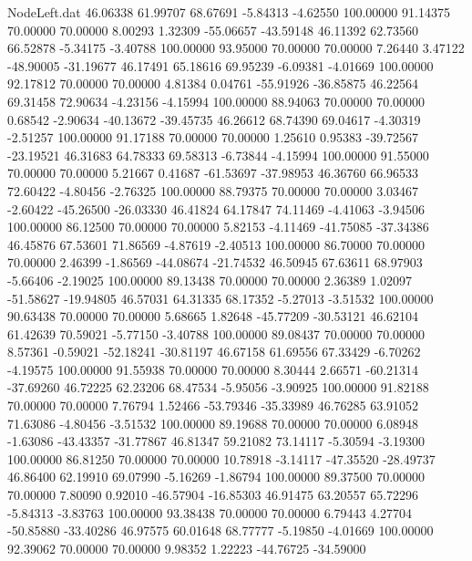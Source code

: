 \begin{filecontents}{NodeLeft.dat}
  46.06338   61.99707   68.67691    -5.84313   -4.62550  100.00000   91.14375   70.00000   70.00000    8.00293    1.32309  -55.06657  -43.59148
  46.11392   62.73560   66.52878    -5.34175   -3.40788  100.00000   93.95000   70.00000   70.00000    7.26440    3.47122  -48.90005  -31.19677
  46.17491   65.18616   69.95239    -6.09381   -4.01669  100.00000   92.17812   70.00000   70.00000    4.81384    0.04761  -55.91926  -36.85875
  46.22564   69.31458   72.90634    -4.23156   -4.15994  100.00000   88.94063   70.00000   70.00000    0.68542   -2.90634  -40.13672  -39.45735
  46.26612   68.74390   69.04617    -4.30319   -2.51257  100.00000   91.17188   70.00000   70.00000    1.25610    0.95383  -39.72567  -23.19521
  46.31683   64.78333   69.58313    -6.73844   -4.15994  100.00000   91.55000   70.00000   70.00000    5.21667    0.41687  -61.53697  -37.98953
  46.36760   66.96533   72.60422    -4.80456   -2.76325  100.00000   88.79375   70.00000   70.00000    3.03467   -2.60422  -45.26500  -26.03330
  46.41824   64.17847   74.11469    -4.41063   -3.94506  100.00000   86.12500   70.00000   70.00000    5.82153   -4.11469  -41.75085  -37.34386
  46.45876   67.53601   71.86569    -4.87619   -2.40513  100.00000   86.70000   70.00000   70.00000    2.46399   -1.86569  -44.08674  -21.74532
  46.50945   67.63611   68.97903    -5.66406   -2.19025  100.00000   89.13438   70.00000   70.00000    2.36389    1.02097  -51.58627  -19.94805
  46.57031   64.31335   68.17352    -5.27013   -3.51532  100.00000   90.63438   70.00000   70.00000    5.68665    1.82648  -45.77209  -30.53121
  46.62104   61.42639   70.59021    -5.77150   -3.40788  100.00000   89.08437   70.00000   70.00000    8.57361   -0.59021  -52.18241  -30.81197
  46.67158   61.69556   67.33429    -6.70262   -4.19575  100.00000   91.55938   70.00000   70.00000    8.30444    2.66571  -60.21314  -37.69260
  46.72225   62.23206   68.47534    -5.95056   -3.90925  100.00000   91.82188   70.00000   70.00000    7.76794    1.52466  -53.79346  -35.33989
  46.76285   63.91052   71.63086    -4.80456   -3.51532  100.00000   89.19688   70.00000   70.00000    6.08948   -1.63086  -43.43357  -31.77867
  46.81347   59.21082   73.14117    -5.30594   -3.19300  100.00000   86.81250   70.00000   70.00000   10.78918   -3.14117  -47.35520  -28.49737
  46.86400   62.19910   69.07990    -5.16269   -1.86794  100.00000   89.37500   70.00000   70.00000    7.80090    0.92010  -46.57904  -16.85303
  46.91475   63.20557   65.72296    -5.84313   -3.83763  100.00000   93.38438   70.00000   70.00000    6.79443    4.27704  -50.85880  -33.40286
  46.97575   60.01648   68.77777    -5.19850   -4.01669  100.00000   92.39062   70.00000   70.00000    9.98352    1.22223  -44.76725  -34.59000

\end{filecontents}
